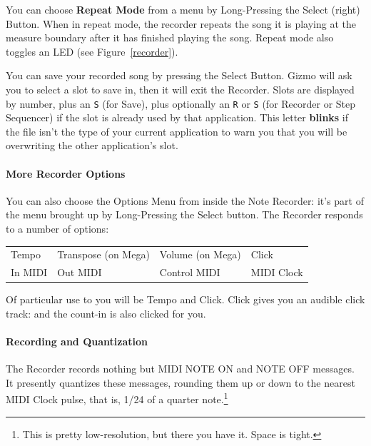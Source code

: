 \documentclass{article}
\begin{document}
You can choose {\bf Repeat Mode} from a menu by Long-Pressing the Select (right) Button.  When in repeat mode, the recorder repeats the song it is playing at the measure boundary after it has finished playing the song.  Repeat mode also toggles an LED (see Figure~\ref{recorder}).

You can save your recorded song by pressing the Select Button.  Gizmo will ask you to select a slot to save in, then it will exit the Recorder.  Slots are displayed by number, plus an \texttt{S} (for Save), plus optionally an \texttt{R} or \texttt{S} (for Recorder or Step Sequencer) if the slot is already used by that application.  This letter {\bf blinks} if the file isn't the type of your current application to warn you that you will be overwriting the other application's slot.

\paragraph{More Recorder Options}  
You can also choose the Options Menu from inside the Note Recorder: it's part of the menu brought up by Long-Pressing the Select button.  The Recorder responds to a number of options:

\vspace{1em}
\begin{tabular}{llll}
Tempo&Transpose (on Mega)&Volume (on Mega)&Click\\
In MIDI& Out MIDI&Control MIDI&MIDI Clock\\
\end{tabular}

\vspace{1em}
Of particular use to you will be Tempo and Click.  Click gives you an audible click track: and the count-in is also clicked for you.

\paragraph{Recording and Quantization}

The Recorder records nothing but MIDI NOTE ON and NOTE OFF messages.  It presently quantizes these messages, rounding them up or down to the nearest MIDI Clock pulse, that is, 1/24 of a quarter note.\footnote{This is pretty low-resolution, but there you have it.  Space is tight.}


\clearpage
\end{document}
